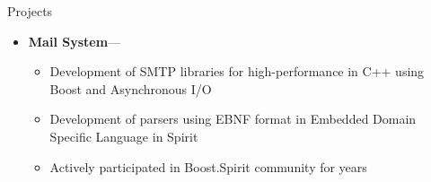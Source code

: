 \documentclass[10pt,oneside]{article}
\newenvironment{ressection}[1]{
	\vspace{4pt}
	{\fontfamily{phv}\selectfont\Large#1}
	\begin{itemize}
	\vspace{3pt}
}{
	\end{itemize}
}
\newcommand{\ressubitem}[1]{
	\vspace{-1pt}
	\item \begin{flushleft} #1 \end{flushleft}
}
\newcommand{\resonelinebigitem}[2]{
	\vspace{-5pt}
	\item
	\textbf{#1}---#2
}
\newenvironment{resonelinesubsec}[2]{
	\resonelinebigitem{#1}{#2}
	\vspace{-2pt}
	\begin{itemize}
}{
	\end{itemize}
}
\begin{document}
\begin{ressection}{Projects}
  \begin{resonelinesubsec}{Mail System}{}
    \ressubitem{Development of SMTP libraries for high-performance in
      C++ using Boost and Asynchronous I/O}
    \ressubitem{Development of parsers using EBNF format in Embedded
      Domain Specific Language in Spirit}
    \ressubitem{Actively participated in Boost.Spirit community for years}
  \end{resonelinesubsec}

\end{ressection}
\end{document}

